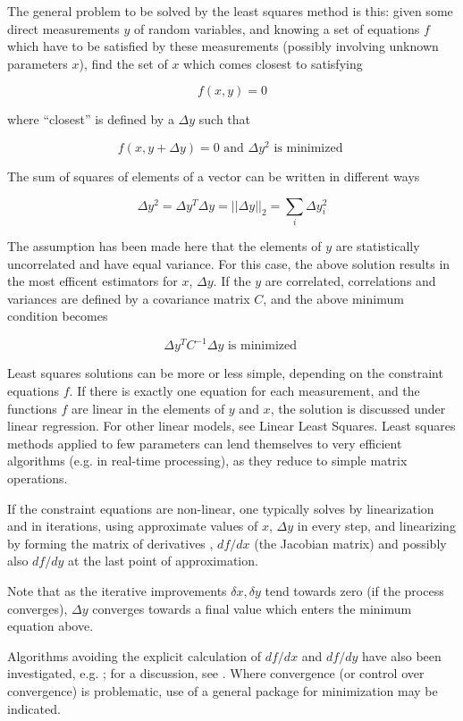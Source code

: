 \documentclass[12pt]{article}
\begin{document}
The general problem to be solved by the least squares method is this: given some direct measurements $y$ of random variables, and knowing a set of equations $f$ which have to be satisfied by these measurements (possibly involving unknown parameters $x$), find the set of $x$ which comes closest to satisfying

$$ f(x,y) = 0 $$

where ``closest'' is defined by a $\Delta y$ such that

$$ f(x,y+\Delta y)=0 \text{ and } \Delta y^2 \text{ is minimized } $$

The sum of squares of elements of a vector can be written in different ways

$$ \Delta y^2 = \Delta y^T \Delta y = ||\Delta y||_2 = \sum_i \Delta y_i^2 $$

The assumption has been made here that the elements of $y$ are statistically uncorrelated and have equal variance. For this case, the above solution results in the most efficent estimators for $x$, $\Delta y$. If the $y$ are correlated, correlations and variances are defined by a covariance matrix $C$, and the above minimum condition becomes

$$ \Delta y^T C^{-1} \Delta y \text{ is minimized } $$

Least squares solutions can be more or less simple, depending on the constraint equations $f$. If there is exactly one equation for each measurement, and the functions $f$ are linear in the elements of $y$ and $x$, the solution is discussed under linear regression. For other linear models, see Linear Least Squares. Least squares methods applied to few parameters can lend themselves to very efficient algorithms (e.g. in real-time  processing), as they reduce to simple matrix operations.

If the constraint equations are non-linear, one typically solves by linearization and in iterations, using approximate values of $x$, $\Delta y$ in every step, and linearizing by forming the matrix of derivatives , $df/dx$ (the Jacobian matrix) and possibly also $df/dy$ at the last point of approximation. 

Note that as the iterative improvements $\delta x, \delta y$ tend towards zero (if the process converges), $\Delta y$ converges towards a final value which enters the minimum equation above.

Algorithms avoiding the explicit calculation of $df/dx$ and $df/dy$ have also been investigated, e.g. \cite{Ralston78b}; for a discussion, see \cite{Press95}. Where convergence (or control over convergence) is problematic, use of a general package for minimization may be indicated.
\end{document}
